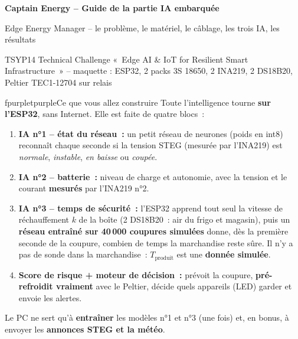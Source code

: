 



\begin{tcolorbox}[enhanced, colback=fblue, colframe=fblue, arc=4mm, boxrule=0pt, left=5mm, right=5mm, top=4mm, bottom=4mm]
{\fontsize{22}{26}\selectfont\bfseries\color{secblue} Captain Energy -- Guide de la partie IA embarquée}\par\vspace{2mm}
{\large\color{subpurple} Edge Energy Manager -- le problème, le matériel, le câblage, les trois IA, les résultats}\par\vspace{2mm}
{\small\color{gray!70!black} TSYP14 Technical Challenge «~Edge AI \& IoT for Resilient Smart Infrastructure~» -- maquette : ESP32, 2 packs 3S 18650, 2 INA219, 2 DS18B20, Peltier TEC1-12704 sur relais}
\end{tcolorbox}

\begin{tbox}{fpurple}{tpurple}{Ce que vous allez construire}
Toute l'intelligence tourne \textbf{sur l'ESP32}, sans Internet. Elle est faite de quatre blocs~:
\begin{enumerate}[nosep, leftmargin=2em]
  \item \textbf{IA n°1 -- état du réseau~:} un petit réseau de neurones (poids en int8) reconnaît chaque seconde si la tension STEG (mesurée par l'INA219) est \emph{normale}, \emph{instable}, \emph{en baisse} ou \emph{coupée}.
  \item \textbf{IA n°2 -- batterie~:} niveau de charge et autonomie, avec la tension et le courant \textbf{mesurés} par l'INA219 n°2.
  \item \textbf{IA n°3 -- temps de sécurité~:} l'ESP32 apprend tout seul la vitesse de réchauffement $k$ de la boîte (2 DS18B20~: air du frigo et magasin), puis un \textbf{réseau entraîné sur 40\,000 coupures simulées} donne, dès la première seconde de la coupure, combien de temps la marchandise reste sûre. Il n'y a pas de sonde dans la marchandise~: $T_{\text{produit}}$ est une \textbf{donnée simulée}.
  \item \textbf{Score de risque + moteur de décision~:} prévoit la coupure, \textbf{pré-refroidit vraiment} avec le Peltier, décide quels appareils (LED) garder et envoie les alertes.
\end{enumerate}
Le PC ne sert qu'à \textbf{entraîner} les modèles n°1 et n°3 (une fois) et, en bonus, à envoyer les \textbf{annonces STEG et la météo}.
\end{tbox}

